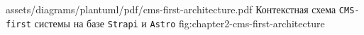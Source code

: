 \appendixdiagram
  {assets/diagrams/plantuml/pdf/cms-first-architecture.pdf}
  {Контекстная схема \texttt{CMS-first} системы на базе \texttt{Strapi} и \texttt{Astro}}
  {fig:chapter2-cms-first-architecture}
